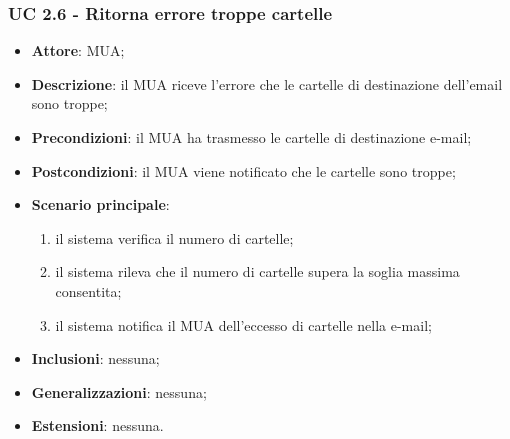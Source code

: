     \subsubsection{UC 2.6 - Ritorna errore troppe cartelle} \label{sec:UC2.6}
    \begin{itemize}
        \item \textbf{Attore}: MUA;
        \item \textbf{Descrizione}: il MUA riceve l'errore che le cartelle di destinazione dell'email sono troppe;
        \item \textbf{Precondizioni}: il MUA ha trasmesso le cartelle di destinazione e-mail;
        \item \textbf{Postcondizioni}: il MUA viene notificato che le cartelle sono troppe;
        \item \textbf{Scenario principale}:
            \begin{enumerate}
                \item il sistema verifica il numero di cartelle;
                \item il sistema rileva che il numero di cartelle supera la soglia massima consentita;
                \item il sistema notifica il MUA dell'eccesso di cartelle nella e-mail;
            \end{enumerate}
        \item \textbf{Inclusioni}: nessuna;
        \item \textbf{Generalizzazioni}: nessuna;
        \item \textbf{Estensioni}: nessuna.
    \end{itemize}
